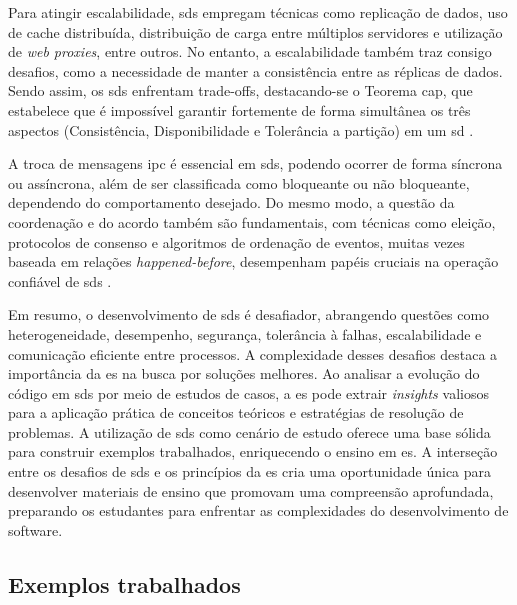 Para atingir escalabilidade, \gls{sds} empregam técnicas como replicação de dados, uso de cache distribuída, distribuição de carga entre múltiplos servidores e utilização de \textit{web proxies}, entre outros. No entanto, a escalabilidade também traz consigo desafios, como a necessidade de manter a consistência entre as réplicas de dados. Sendo assim, os \gls{sds} enfrentam trade-offs, destacando-se o Teorema \gls{cap}, que estabelece que é impossível garantir fortemente de forma simultânea os três aspectos (Consistência, Disponibilidade e Tolerância a partição) em um \gls{sd} \cite{TwentyYearsLaterEricBrewer2012}.

A troca de mensagens \gls{ipc} é essencial em \gls{sds}, podendo ocorrer de forma síncrona ou assíncrona, além de ser classificada como bloqueante ou não bloqueante, dependendo do comportamento desejado. Do mesmo modo, a questão da coordenação e do acordo também são fundamentais, com técnicas como eleição, protocolos de consenso e algoritmos de ordenação de eventos, muitas vezes baseada em relações \textit{happened-before}, desempenham papéis cruciais na operação confiável de \gls{sds} \cite{DistributedSystemsCoulouris}.

Em resumo, o desenvolvimento de \gls{sds} é desafiador, abrangendo questões como heterogeneidade, desempenho, segurança, tolerância à falhas, escalabilidade e comunicação eficiente entre processos. A complexidade desses desafios destaca a importância da \gls{es} na busca por soluções melhores. Ao analisar a evolução do código em \gls{sds} por meio de estudos de casos, a \gls{es} pode extrair \textit{insights} valiosos para a aplicação prática de conceitos teóricos e estratégias de resolução de problemas. A utilização de \gls{sds} como cenário de estudo oferece uma base sólida para construir exemplos trabalhados, enriquecendo o ensino em \gls{es}. A interseção entre os desafios de \gls{sds} e os princípios da \gls{es} cria uma oportunidade única para desenvolver materiais de ensino que promovam uma compreensão aprofundada, preparando os estudantes para enfrentar as complexidades do desenvolvimento de software.

\subsection{Exemplos trabalhados}

